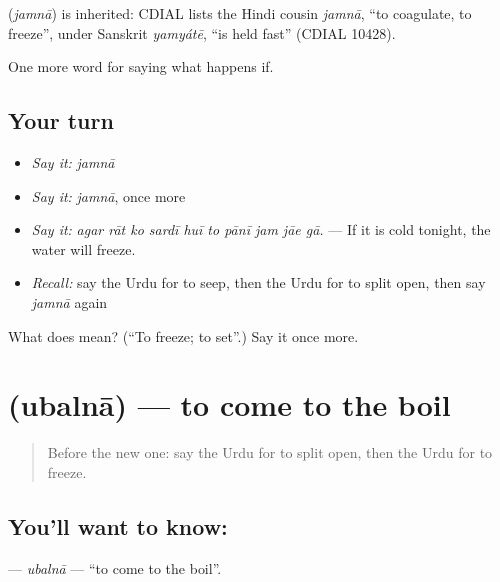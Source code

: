 \begin{cousinweb}
\textbf{} (\emph{jamnā}) is inherited: CDIAL lists the Hindi cousin \emph{jamnā}, \textquotedblleft{}to coagulate, to freeze\textquotedblright{}, under Sanskrit \emph{yamyátē}, \textquotedblleft{}is held fast\textquotedblright{} (CDIAL 10428).
\end{cousinweb}

\begin{grammarlens}[title={What you've built}]
One more word for saying what happens if.
\end{grammarlens}

\subsection*{Your turn}
\begin{itemize}
\raggedright
  \item \emph{Say it:} \emph{jamnā}
  \item \emph{Say it:} \emph{jamnā}, once more
  \item \emph{Say it:} \emph{agar rāt ko sardī huī to pānī jam jāe gā.} — If it is cold tonight, the water will freeze.
  \item \emph{Recall:} say the Urdu for to seep, then the Urdu for to split open, then say \emph{jamnā} again
\end{itemize}

\begin{tcolorbox}[breakable,colback=teal!4,colframe=teal!35!black,title={Before you move on}]
What does  mean? (\textquotedblleft{}To freeze; to set\textquotedblright{}.) Say it once more.
\end{tcolorbox}
\section[\texorpdfstring{\ur{ابلنا} (ubalnā)}{ابلنا (ubalnā)}]{ (ubalnā) — to come to the boil}

\label{lesson:UR-C372-ubalna-boil-up}



\begin{quote}
Before the new one: say the Urdu for to split open, then the Urdu for to freeze.
\end{quote}

\subsection*{You'll want to know: }
\textbf{} — \emph{ubalnā} — \textquotedblleft{}to come to the boil\textquotedblright{}.

